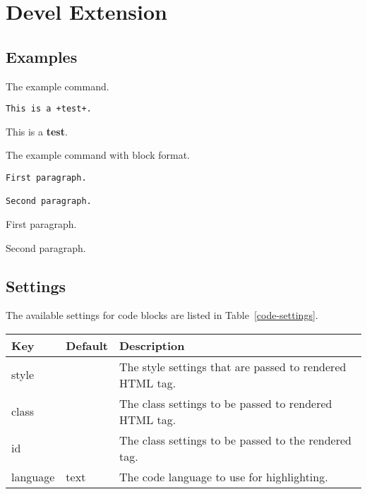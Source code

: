 
\chapter{\label{devel-extension}Devel Extension}
\section{\label{examples}Examples}
\begin{example}[label=markdown-example]{The example command.}

\begin{verbatim}
This is a +test+.
\end{verbatim}

\tcblower
\par This is a \textbf{test}.
\end{example}

\begin{example}[label=markdown-example2]{The example command with block format.}

\begin{verbatim}
First paragraph.

Second paragraph.
\end{verbatim}

\tcblower
\par First paragraph.
\par Second paragraph. 
\end{example}

\section{\label{settings}Settings}
\par The available settings for code blocks are listed in Table~\ref{code-settings}.\par\begin{tabulary}{\textwidth}{LLL}
\toprule
Key &Default &Description \\
\midrule
style & &The style settings that are passed to rendered HTML tag. \\
class & &The class settings to be passed to rendered HTML tag. \\
id & &The class settings to be passed to the rendered tag. \\
language &text &The code language to use for highlighting. \\
\bottomrule
\end{tabulary}

